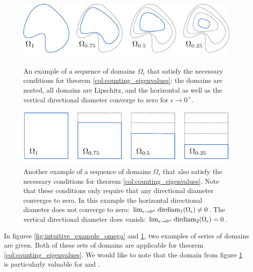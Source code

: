 \begin{figure}[t]
  \begin{center}
    \includegraphics[width=\linewidth]{img/chapter3/counting/main-theorem-omega.pdf}
    \caption{\label{fig:intuitive_example_omega} An example of a sequence of domains $\Omega_\epsilon$ that satisfy the necessary conditions for theorem \ref{col:counting_eigenvalues}: the domains are nested, all domains are Lipschitz, and the horizontal as well as the vertical directional diameter converge to zero for $\epsilon \to 0^{+}$.}
  \end{center}

  \begin{center}
    \includegraphics[width=\linewidth]{img/chapter3/counting/main-theorem-rho.pdf}
    \caption{\label{fig:intuitive_example_rho} Another example of a sequence of domains $\Omega_\epsilon$ that also satisfy the necessary conditions for theorem \ref{col:counting_eigenvalues}. Note that these conditions only require that any directional diameter converges to zero. In this example the horizontal directional diameter does not converge to zero: $\lim_{\epsilon \to 0^+}\operatorname{dirdiam}_1(\Omega_\epsilon) \neq 0$. The vertical directional diameter does vanish: $\lim_{\epsilon \to 0^+}\operatorname{dirdiam}_2(\Omega_\epsilon) = 0$.}
  \end{center}
\end{figure}

In figures \ref{fig:intuitive_example_omega} and \ref{fig:intuitive_example_rho}, two examples of series of domains are given. Both of these sets of domains are applicable for theorem \ref{col:counting_eigenvalues}. We would like to note that the domain from figure \ref{fig:intuitive_example_rho} is particularly valuable for \cite{ixaru_new_2010} and \cite{baeyens_improvements_2022}.


